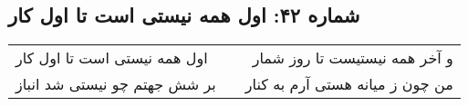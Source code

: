 \begin{center}
\section*{شماره ۴۲: اول همه نیستی است تا اول کار}
\label{sec:042}
\begin{longtable}{l p{0.5cm} r}
اول همه نیستی است تا اول کار
&&
و آخر همه نیستیست تا روز شمار
\\
بر شش جهتم چو نیستی شد انباز
&&
من چون ز میانه هستی آرم به کنار
\\
\end{longtable}
\end{center}
